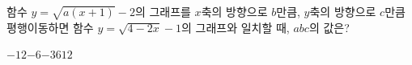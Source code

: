 \hspace*{2mm}\begin{minipage}[t]{\dimexpr\linewidth-2mm\relax}\vspace{0pt}
함수 $y=\sqrt{a(x+1)}-2$의 그래프를 $x$축의 방향으로 $b$만큼, $y$축의 방향으로 $c$만큼 평행이동하면 함수 $y=\sqrt{4-2x}-1$의 그래프와 일치할 때, $abc$의 값은? 
\begin{choices32}{$-12$}{$-6$}{$-3$}{$6$}{$12$}\end{choices32}\end{minipage}
